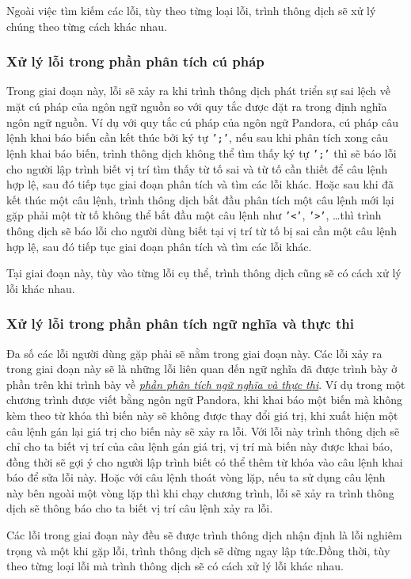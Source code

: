 Ngoài việc tìm kiếm các lỗi, tùy theo từng loại lỗi, trình thông dịch sẽ xử lý chúng theo từng cách khác nhau.

\subsubsection{Xử lý lỗi trong phần phân tích cú pháp}
Trong giai đoạn này, lỗi sẽ xảy ra khi trình thông dịch phát triển sự sai lệch về mặt cú pháp của ngôn ngữ nguồn so với quy tắc được đặt ra trong định nghĩa ngôn ngữ nguồn. Ví dụ với quy tắc cú pháp của ngôn ngữ Pandora, cú pháp câu lệnh khai báo biến cần kết thúc bởi ký tự \texttt{';'}, nếu sau khi phân tích xong câu lệnh khai báo biến, trình thông dịch không thể tìm thấy ký tự \texttt{';'} thì sẽ báo lỗi cho người lập trình biết vị trí tìm thấy từ tố sai và từ tố cần thiết để câu lệnh hợp lệ, sau đó tiếp tục giai đoạn phân tích và tìm các lỗi khác. Hoặc sau khi đã kết thúc một câu lệnh, trình thông dịch bắt đầu phân tích một câu lệnh mới lại gặp phải một từ tố không thể bắt đầu một câu lệnh như \texttt{'<'}, \texttt{'>'}, \dots thì trình thông dịch sẽ báo lỗi cho người dùng biết tại vị trí từ tố bị sai cần một câu lệnh hợp lệ, sau đó tiếp tục giai đoạn phân tích và tìm các lỗi khác.

Tại giai đoạn này, tùy vào từng lỗi cụ thể, trình thông dịch cũng sẽ có cách xử lý lỗi khác nhau.

\subsubsection{Xử lý lỗi trong phần phân tích ngữ nghĩa và thực thi}
Đa số các lỗi người dùng gặp phải sẽ nằm trong giai đoạn này. Các lỗi xảy ra trong giai đoạn này sẽ là những lỗi liên quan đến ngữ nghĩa đã được trình bày ở phần trên khi trình bày về \hyperref[ch1:semantic]{\textit{phần phân tích ngữ nghĩa và thực thi}}. Ví dụ trong một chương trình được viết bằng ngôn ngữ Pandora, khi khai báo một biến mà không kèm theo từ khóa  thì biến này sẽ không được thay đổi giá trị, khi xuất hiện một câu lệnh gán lại giá trị cho biến này sẽ xảy ra lỗi. Với lỗi này trình thông dịch sẽ chỉ cho ta biết vị trí của câu lệnh gán giá trị, vị trí mà biến này được khai báo, đồng thời sẽ gợi ý cho người lập trình biết có thể thêm từ khóa  vào câu lệnh khai báo để sửa lỗi này. Hoặc với câu lệnh thoát vòng lặp, nếu ta sử dụng câu lệnh này bên ngoài một vòng lặp thì khi chạy chương trình, lỗi sẽ xảy ra trình thông dịch sẽ thông báo cho ta biết vị trí câu lệnh xảy ra lỗi.

Các lỗi trong giai đoạn này đều sẽ được trình thông dịch nhận định là lỗi nghiêm trọng và một khi gặp lỗi, trình thông dịch sẽ dừng ngay lập tức.Đồng thời, tùy theo từng loại lỗi mà trình thông dịch sẽ có cách xử lý lỗi khác nhau.
